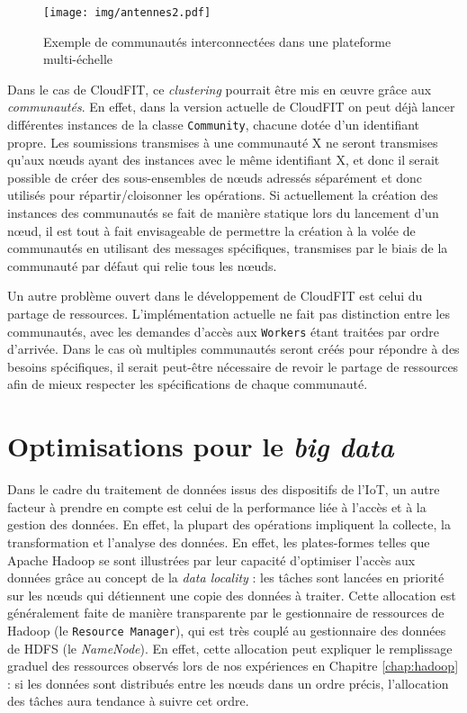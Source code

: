 \begin{figure}[!ht]
	\centering
	\texttt{[image: img/antennes2.pdf]}
	\caption{Exemple de communautés interconnectées dans une plateforme multi-échelle}
	\label{fig:antennes}
\end{figure}


Dans le cas de CloudFIT, ce \textit{clustering} pourrait être mis en {\oe}uvre grâce aux \textit{communautés}. En effet, dans la version actuelle de CloudFIT on peut déjà lancer différentes instances de la classe \texttt{Community}, chacune dotée d'un identifiant propre. Les soumissions transmises à une communauté X ne seront transmises qu'aux n{\oe}uds ayant des instances avec le même identifiant X, et donc il serait possible de créer des sous-ensembles de n{\oe}uds adressés séparément et donc utilisés pour répartir/cloisonner les opérations. Si actuellement la création des instances des communautés se fait de manière statique lors du lancement d'un n{\oe}ud, il est tout à fait envisageable de permettre la création à la volée de communautés en utilisant des messages spécifiques, transmises par le biais de la communauté par défaut qui relie tous les n{\oe}uds.  

Un autre problème ouvert dans le développement de CloudFIT est celui du partage de ressources. L'implémentation actuelle ne fait pas distinction entre les communautés, avec les demandes d'accès aux \texttt{Workers} étant traitées par ordre d'arrivée. Dans le cas où multiples communautés seront créés pour répondre à des besoins spécifiques, il serait peut-être nécessaire de revoir le partage de ressources afin de mieux respecter les spécifications de chaque communauté. 

 

\section{Optimisations pour le \textit{big data}\label{sec:datalocality}}
%
Dans le cadre du traitement de données issus des dispositifs de l'IoT, un autre facteur à prendre en compte est celui de la performance liée à l'accès et à la gestion des données. En effet, la plupart des opérations impliquent la collecte, la transformation et l'analyse des données. En effet, les plates-formes telles que Apache Hadoop se sont illustrées par leur capacité d'optimiser l'accès aux données grâce au concept de la \textit{data locality} : les tâches sont lancées en priorité sur les n{\oe}uds qui détiennent une copie des données à traiter. Cette allocation est généralement faite de manière transparente par le gestionnaire de ressources de Hadoop (le \texttt{Resource Manager}), qui est très couplé au gestionnaire des données de HDFS (le \textit{NameNode}). En effet, cette allocation peut expliquer le remplissage graduel des ressources observés lors de nos expériences en Chapitre \ref{chap:hadoop} : si les données sont distribués entre les n{\oe}uds dans un ordre précis, l'allocation des tâches aura tendance à suivre cet ordre.

